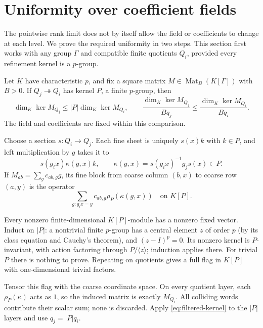 \section{Uniformity over coefficient fields}\label{sec:uniformity}

The pointwise rank limit does not by itself allow the field or
coefficients to change at each level. We prove the required uniformity
in two steps. This section first works with any group $\Gamma$ and
compatible finite quotients $Q_i$, provided every refinement kernel
is a $p$-group.

\begin{lemma}\label{lem:monotone}
\notformalized
Let $K$ have characteristic $p$, and fix a square matrix
$M\in\operatorname{Mat}_B(K[\Gamma])$ with $B>0$.
If $Q_j\twoheadrightarrow Q_i$ has kernel $P$, a finite $p$-group,
then
\[
 \dim_K\ker M_{Q_j}\le |P|\dim_K\ker M_{Q_i},\qquad
 \frac{\dim_K\ker M_{Q_j}}{Bq_j}
       \le\frac{\dim_K\ker M_{Q_i}}{Bq_i}.
\]
The field and coefficients are fixed within this comparison.
\end{lemma}
\begin{informalproof}
Choose a section $s:Q_i\to Q_j$. Each fine sheet is uniquely $s(x)k$
with $k\in P$, and left multiplication by $g$ takes it to
\[
 s(g_ix)\kappa(g,x)k,\qquad
 \kappa(g,x)=s(g_ix)^{-1}g_js(x)\in P.
\]
If $M_{ab}=\sum_gc_{ab,g}g$, its fine block from coarse column $(b,x)$
to coarse row $(a,y)$ is the operator
\[
 \sum_{g:g_ix=y}c_{ab,g}\rho_P(\kappa(g,x))\quad\text{on }K[P].
\]

Every nonzero finite-dimensional $K[P]$-module has a nonzero fixed
vector. Induct on $|P|$: a nontrivial finite $p$-group has a central
element $z$ of order $p$ (by its class equation and Cauchy's theorem),
and $(z-I)^p=0$. Its nonzero kernel is $P$-invariant, with action
factoring through $P/\langle z\rangle$; induction applies there.
For trivial $P$ there is nothing to prove. Repeating on quotients
gives a full flag in $K[P]$ with one-dimensional trivial factors.

Tensor this flag with the coarse coordinate space. On every quotient
layer, each $\rho_P(\kappa)$ acts as $1$, so the induced matrix is
exactly $M_{Q_i}$. All colliding words contribute their scalar sum;
none is discarded. Apply \eqref{eq:filtered-kernel} to the $|P|$
layers and use $q_j=|P|q_i$.
\end{informalproof}

